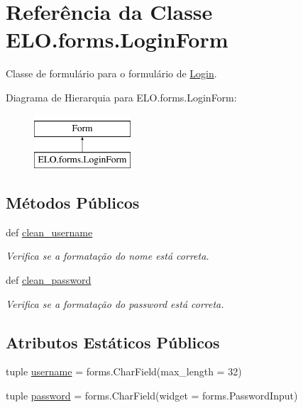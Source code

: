 \hypertarget{classELO_1_1forms_1_1LoginForm}{\section{Referência da Classe E\-L\-O.\-forms.\-Login\-Form}
\label{de/da2/classELO_1_1forms_1_1LoginForm}
}


Classe de formulário para o formulário de \hyperlink{namespaceLogin}{Login}.  


Diagrama de Hierarquia para E\-L\-O.\-forms.\-Login\-Form\-:\begin{figure}[H]
\begin{center}
\leavevmode
\includegraphics[height=2.000000cm]{de/da2/classELO_1_1forms_1_1LoginForm}
\end{center}
\end{figure}
\subsection*{Métodos Públicos}
\begin{DoxyCompactItemize}
\item 
def \hyperlink{classELO_1_1forms_1_1LoginForm_a1507a6366b1b821a2fa3f242aa606f85}{clean\-\_\-username}
\begin{DoxyCompactList}\small\item\em Verifica se a formatação do nome está correta. \end{DoxyCompactList}\item 
def \hyperlink{classELO_1_1forms_1_1LoginForm_a37cda66e10767bd074615d6bd39b1b8c}{clean\-\_\-password}
\begin{DoxyCompactList}\small\item\em Verifica se a formatação do password está correta. \end{DoxyCompactList}\end{DoxyCompactItemize}
\subsection*{Atributos Estáticos Públicos}
\begin{DoxyCompactItemize}
\item 
tuple \hyperlink{classELO_1_1forms_1_1LoginForm_aa093b687c878b2b5a6bf52718dac480d}{username} = forms.\-Char\-Field(max\-\_\-length = 32)
\item 
tuple \hyperlink{classELO_1_1forms_1_1LoginForm_a3bc2d5d337bbe87a543b48b52315d199}{password} = forms.\-Char\-Field(widget = forms.\-Password\-Input)
\end{DoxyCompactItemize}


